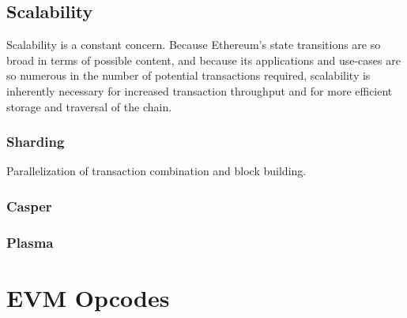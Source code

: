 \documentclass[10pt,letterpaper,leqno,bibliography=totoc]{scrartcl}
\newenvironment{alphafootnotes}
{\par\edef\savedfootnotenumber{\number\value{footnote}}
\renewcommand{\thefootnote}{\alph{footnote}}
\setcounter{footnote}{0}}
{\par\setcounter{footnote}{\savedfootnotenumber}}
\begin{document}
\begin{alphafootnotes}
\begin{multicols*}{2}
		\subsection{Scalability} Scalability is a constant concern. Because Ethereum's state transitions are so broad in terms of possible content, and because its applications and use-cases are so numerous in the number of potential transactions required, scalability is inherently necessary for increased transaction throughput and for more efficient storage and traversal of the chain.
		\subsubsection{Sharding}
		Parallelization of transaction combination and block building.
		\subsubsection{Casper}
		\subsubsection{Plasma}
		
			
	\end{multicols*}

	\appendix

	\section{EVM Opcodes\supercite{Buterin2017}} 


\end{alphafootnotes}
\end{document}
